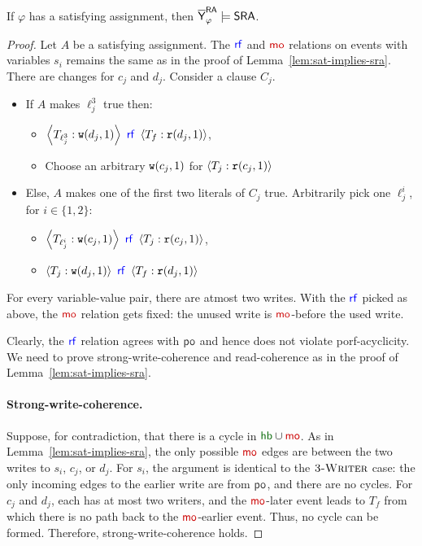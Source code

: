 \begin{lemma}
If $\varphi$ has a satisfying assignment, then $\overline{\mathsf{\color{black}Y}}_\varphi^{\mathsf{RA}} \models \mathsf{SRA}$. 
\end{lemma}
\begin{proof}
Let $A$ be a satisfying assignment. The $\rf$ and $\mo$ relations on events with variables $s_i$ remains the same as in the proof of Lemma~\ref{lem:sat-implies-sra}. There are changes for $c_j$ and $d_j$. Consider a clause $C_j$.
\begin{itemize}
\item If $A$ makes $\ell_j^3$ true then:
\begin{itemize}
\item $\tuple{T_{\ell_j^3}: \wt(d_j, 1)}~\rf~\tuple{T_f: \rd(d_j, 1)}$,
\item Choose an arbitrary $\mathtt{w}(c_j, 1)$ for $\left\langle T_j: \mathtt{r}(c_j, 1)\right\rangle$
\end{itemize}
\item Else, $A$ makes one of the first two literals of $C_j$ true. Arbitrarily pick one $\ell_j^i$, for $i \in \{1,2\}$:  
\begin{itemize}
\item $\tuple{T_{\ell_j^i}: \wt(c_j, 1)}~\rf~ \tuple{T_j: \rd(c_j, 1)}$,
\item $\tuple{T_{j}:\wt(d_j, 1)}~\rf~\tuple{T_f: \rd(d_j, 1)}$
\end{itemize}
\end{itemize}
For every variable-value pair, there are atmost two writes. With the $\rf$ picked as above, the $\mo$ relation gets fixed: the unused write is $\mo$-before the used write.

Clearly, the $\rf$ relation agrees with $\po$ and hence does not violate porf-acyclicity. We need to prove strong-write-coherence and read-coherence as in the proof of Lemma~\ref{lem:sat-implies-sra}.

\paragraph*{Strong-write-coherence.} 
Suppose, for contradiction, that there is a cycle in $\hb \cup \mo$. As in Lemma~\ref{lem:sat-implies-sra}, the only possible $\mo$ edges are between the two writes to $s_i$, $c_j$, or $d_j$. For $s_i$, the argument is identical to the $\textsc{3-Writer}$ case: the only incoming edges to the earlier write are from $\po$, and there are no cycles. For $c_j$ and $d_j$, each has at most two writers, and the $\mo$-later event leads to $T_f$ from which there is no path back to the $\mo$-earlier event. Thus, no cycle can be formed. Therefore, strong-write-coherence holds.


\end{proof}
